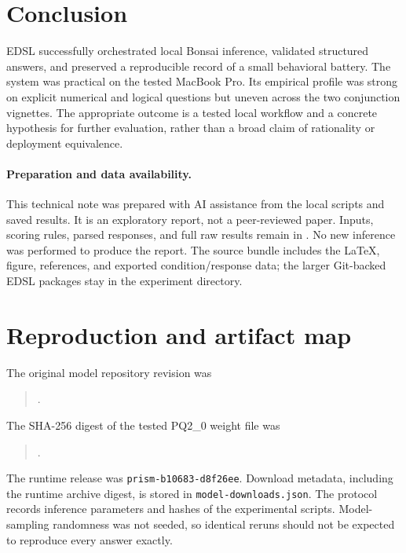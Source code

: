 \documentclass[11pt,letterpaper]{article}
\begin{document}
\section{Conclusion}
EDSL successfully orchestrated local Bonsai inference, validated structured
answers, and preserved a reproducible record of a small behavioral battery.
The system was practical on the tested MacBook Pro. Its empirical profile was
strong on explicit numerical and logical questions but uneven across the two
conjunction vignettes. The appropriate outcome is a tested local workflow and
a concrete hypothesis for further evaluation, rather than a broad claim of
rationality or deployment equivalence.

\paragraph{Preparation and data availability.}
This technical note was prepared with AI assistance from the local scripts and
saved results. It is an exploratory report, not a peer-reviewed paper.
Inputs, scoring rules, parsed responses, and full raw results remain in
. No new inference was performed
to produce the report. The source bundle includes the LaTeX, figure, references,
and exported condition/response data; the larger Git-backed EDSL packages stay
in the experiment directory.




\clearpage
\appendix
\section{Reproduction and artifact map}\label{app:reproduce}
The original model repository revision was
\begin{quote}\small{}.\end{quote}
The SHA-256 digest of the tested PQ2\_0 weight file was
\begin{quote}\small{}.\end{quote}
The runtime release was \texttt{prism-b10683-d8f26ee}. Download metadata,
including the runtime archive digest, is stored in \texttt{model-downloads.json}.
The protocol records inference parameters and hashes of the experimental
scripts. Model-sampling randomness was not seeded, so identical reruns should
not be expected to reproduce every answer exactly.
\end{document}
